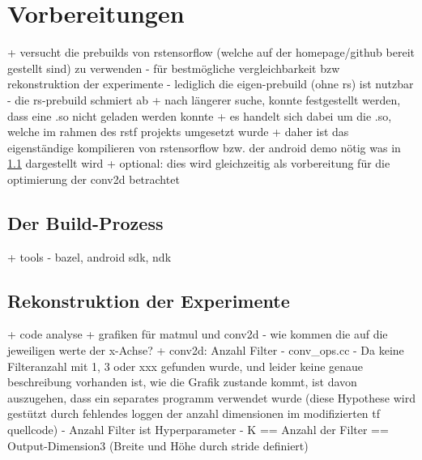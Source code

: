 \section{Vorbereitungen}
\label{sec:vorbereitungen}
+ versucht die prebuilds von rstensorflow (welche auf der homepage/github bereit gestellt sind) zu verwenden
	- für bestmögliche vergleichbarkeit bzw rekonstruktion der experimente
	- lediglich die eigen-prebuild (ohne rs) ist nutzbar
	- die rs-prebuild schmiert ab
		+ nach längerer suche, konnte festgestellt werden, dass eine .so nicht geladen werden konnte
		+ es handelt sich dabei um die .so, welche im rahmen des rstf projekts umgesetzt wurde
		+ daher ist das eigenständige kompilieren von rstensorflow bzw. der android demo nötig was in \ref{subsec:buildprozess} dargestellt wird
		+ optional: dies wird gleichzeitig als vorbereitung für die optimierung der conv2d betrachtet
		

\subsection{Der Build-Prozess}
\label{subsec:buildprozess}
+ tools - bazel, android sdk, ndk

\subsection{Rekonstruktion der Experimente}
\label{subsec:rekonstruktion}
+ code analyse
+ grafiken für matmul und conv2d - wie kommen die auf die jeweiligen werte der x-Achse?
	+ conv2d: Anzahl Filter
		- conv\_ops.cc
		- Da keine Filteranzahl mit 1, 3 oder xxx gefunden wurde, und leider keine genaue beschreibung vorhanden ist, wie die Grafik zustande kommt, ist davon auszugehen, dass ein separates programm verwendet wurde (diese Hypothese wird gestützt durch fehlendes loggen der anzahl dimensionen im modifizierten tf quellcode)
		- Anzahl Filter ist Hyperparameter
		- K == Anzahl der Filter == Output-Dimension3 (Breite und Höhe durch stride definiert)
